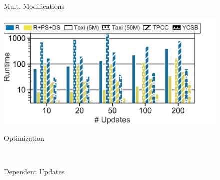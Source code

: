 \begin{figure}[t]
\begin{minipage}[b]{0.245\linewidth}
               \caption{Mult. Modifications}
               \label{fig:Multimod}
\end{minipage}
\begin{minipage}[b]{0.275\linewidth}
               \hspace{-0.4cm}
               \includegraphics[width=1.2\linewidth,trim=0            0 0                                     0,                             clip]{imgs/felix_optimizations.pdf}      \\
               \vspace{-8mm}
               \caption{Optimization}
               \label{fig:optimization}
               \end{minipage}
               \begin{minipage}[b]{0.235\linewidth}
               \hspace{2mm}
                \\
               \vspace{-8mm}
               \caption{Dependent Updates}
               \label{fig:Dependent Updates}

\end{minipage}
\end{figure}
